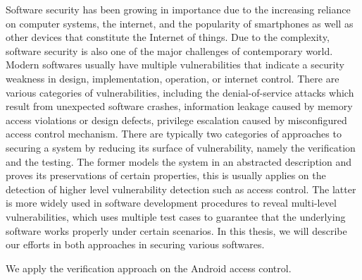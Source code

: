 
Software security has been growing in importance due to the increasing reliance on computer systems, the internet, and the popularity of smartphones as well as other devices that constitute the Internet of things. Due to the complexity, software security is also one of the major challenges of contemporary world. Modern softwares usually have multiple vulnerabilities that indicate a security weakness in design, implementation, operation, or internet control. There are various categories of vulnerabilities, including the denial-of-service attacks which result from unexpected software crashes, information leakage caused by memory access violations or design defects, privilege escalation caused by misconfigured access control mechanism. There are typically two categories of approaches to securing a system by reducing its surface of vulnerability, namely the verification and the testing. The former models the system in an abstracted description and proves its preservations of certain properties, this is usually applies on the detection of higher level vulnerability detection such as access control. The latter is more widely used in software development procedures to reveal multi-level vulnerabilities, which uses multiple test cases to guarantee that the underlying software works properly under certain scenarios. In this thesis, we will describe our efforts in both approaches in securing various softwares.

We apply the verification approach on the Android access control. 